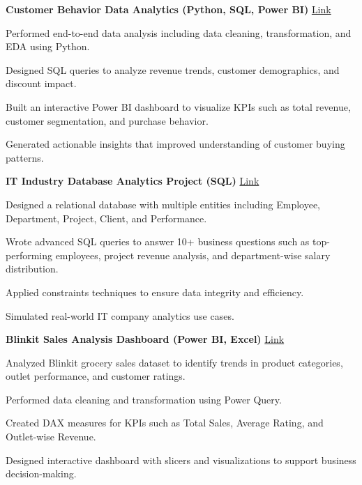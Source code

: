 \documentclass[letterpaper,10pt]{article}
\newenvironment{resume_list}{
  \vspace{-4pt}
  \begin{itemize}[leftmargin=18pt, itemsep=-3pt]
}{
  \end{itemize}
}
\begin{document}
\textbf{Customer Behavior Data Analytics (Python, SQL, Power BI)} 
\hfill \href{https://github.com/Krishna101211/Customer-behaviour-/blob/main/customer_behavior_dashboard.pdf}{Link}
\begin{resume_list}
  \item Performed end-to-end data analysis including data cleaning, transformation, and EDA using Python.
  \item Designed SQL queries to analyze revenue trends, customer demographics, and discount impact.
  \item Built an interactive Power BI dashboard to visualize KPIs such as total revenue, customer segmentation, and purchase behavior.
  \item Generated actionable insights that improved understanding of customer buying patterns.
\end{resume_list}

\textbf{IT Industry Database Analytics Project (SQL)} 
\hfill \href{https://github.com/Krishna101211/SQL-IT-DataBase}{Link}
\begin{resume_list}
  \item Designed a relational database with multiple entities including Employee, Department, Project, Client, and Performance.
  \item Wrote advanced SQL queries to answer 10+ business questions such as top-performing employees, project revenue analysis, and department-wise salary distribution.
  \item Applied constraints techniques to ensure data integrity and efficiency.
  \item Simulated real-world IT company analytics use cases.
\end{resume_list}

\textbf{Blinkit Sales Analysis Dashboard (Power BI, Excel)} 
\hfill \href{https://github.com/Krishna101211/Blinkit-sales-analysis-/blob/main/Blinkit.pdf}{Link}
\begin{resume_list}
  \item Analyzed Blinkit grocery sales dataset to identify trends in product categories, outlet performance, and customer ratings.
  \item Performed data cleaning and transformation using Power Query.
  \item Created DAX measures for KPIs such as Total Sales, Average Rating, and Outlet-wise Revenue.
  \item Designed interactive dashboard with slicers and visualizations to support business decision-making.
\end{resume_list}
\end{document}
